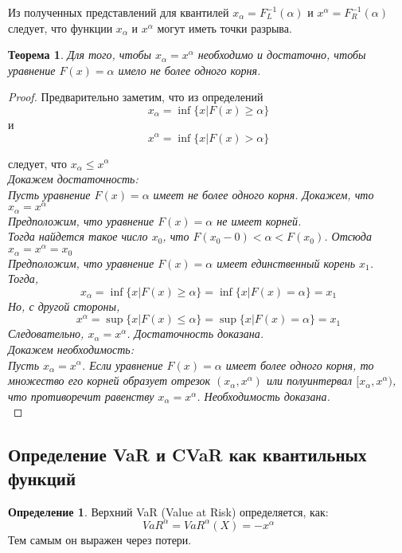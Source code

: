 \documentclass[18pt,a4paper]{article}
\theoremstyle{plain}
\newtheorem{Th}{Теорема}[section]
\theoremstyle{definition}
\newtheorem{Def}{Определение}[section]
\begin{document}
Из полученных представлений для квантилей $x_{\alpha} = F^{-1}_{L}(\alpha)$ и $x^{\alpha} = F^{-1}_{R}(\alpha)$ следует, что функции $x_{\alpha}$ и $x^{\alpha}$ могут иметь точки разрыва.
\begin{Th} \label{main}
Для того, чтобы $x_{\alpha}=x^{\alpha}$ необходимо и достаточно, чтобы уравнение $F(x)=\alpha$ имело не более одного корня.
\end{Th}
\begin{proof}
Предварительно заметим, что из определений
$$
x_{\alpha} = \inf \{x|F(x) \ge \alpha  \}
$$
\center
и
\flushleft
$$
x^{\alpha} = \inf \{x|F(x) > \alpha \}
$$

следует, что  $x_{\alpha} \le x^{\alpha}$\\
\hspace{20pt} \it Докажем достаточность:\rm\\
Пусть уравнение $F(x)=\alpha$ имеет не более одного корня.  Докажем, что $x_{\alpha}=x^{\alpha}$\\
Предположим, что уравнение $F(x)=\alpha$ не имеет корней.\\
Тогда найдется такое число $x_0$, что $F(x_0-0) < \alpha < F(x_0)$. Отсюда $x_{\alpha}=x^{\alpha}=x_0$\\
Предположим, что уравнение $F(x)=\alpha$ имеет единственный корень $x_1$.\\
Тогда,
$$
x_{\alpha} = \inf \{x|F(x) \ge \alpha \} = \inf \{x|F(x)=\alpha  \} = x_1
$$
Но, с другой стороны,
$$
x^{\alpha} = \sup \{x|F(x) \le \alpha \} = \sup\{x|F(x)=\alpha \} =x_1
$$
Следовательно, $x_{\alpha}=x^{\alpha}$. Достаточность доказана.\\
 \hspace{20pt} \it Докажем необходимость:\rm\\
Пусть $x_{\alpha}=x^{\alpha}$. Если уравнение $F(x) =  \alpha$ имеет более одного корня, то множество его корней образует отрезок $(x_{\alpha}, x^{\alpha})$ или полуинтервал  $[x_{\alpha}, x^{\alpha})$, что противоречит равенству $x_{\alpha}=x^{\alpha}$. Необходимость доказана.\\
\end{proof}

\centering\subsection{Определение VaR и CVaR как квантильных функций}
\flushleft
\begin{Def} \label{main}
Верхний VaR (Value at Risk) определяется, как:
$$
VaR^{\alpha} = VaR^{\alpha} (X) = -x^{\alpha}
$$
Тем самым он выражен через потери.\\
\end{Def}
\end{document}
